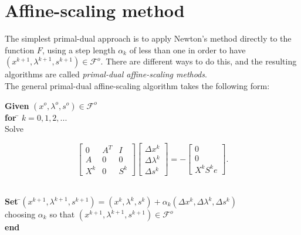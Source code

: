 \documentclass[a4paper,10 pt,titlepage,twoside]{book}
\theoremstyle{plain}
\theoremstyle{definition}
\theoremstyle{remark}
\begin{document}
\section{Affine-scaling method}

The simplest primal-dual approach is to apply Newton's method directly to the function $F$, using a step length $\alpha_{k}$ of less than one in order to have $(x^{k+1},\lambda^{k+1},s^{k+1})\in \mathcal{F}^{o}$. There are different ways to do this, and the resulting algorithms are called \textit{primal-dual affine-scaling methods}.\\ 
 The general primal-dual affine-scaling algorithm takes the following form:
\begin{tabbing}
	\textbf{Given} $(x^{o}, \lambda^{o}, s^{o})\in\mathcal{F}^{o}$ \\
	\textbf{for} \= $k = 0, 1, 2,...$ \\
	\> Solve
\end{tabbing}
\begin{equation}\label{(AS)}
\begin{bmatrix}
0&A^{T}&I \\A&0&0\\X^{k}&0&S^{k}
\end{bmatrix}\begin{bmatrix}
\Delta x^{k}\\\Delta\lambda^{k} \\\Delta s^{k}
\end{bmatrix}=-\begin{bmatrix}
0\\0\\X^{k}S^{k}e
\end{bmatrix}.
\end{equation}
\begin{tabbing}
	\\
	\textbf{Set} \=$(x^{k+1}, \lambda^{k+1}, s^{k+1}) = (x^{k}, \lambda^{k}, s^{k})+ \alpha_{k}(\Delta x^{k}, \Delta\lambda^{k}, \Delta s^{k})$\\
	\> choosing $\alpha_{k}$ so that $(x^{k+1},\lambda^{k+1}, s^{k+1})\in\mathcal{F}^{o}$ \\
	\textbf{end}
\end{tabbing}
\end{document}
